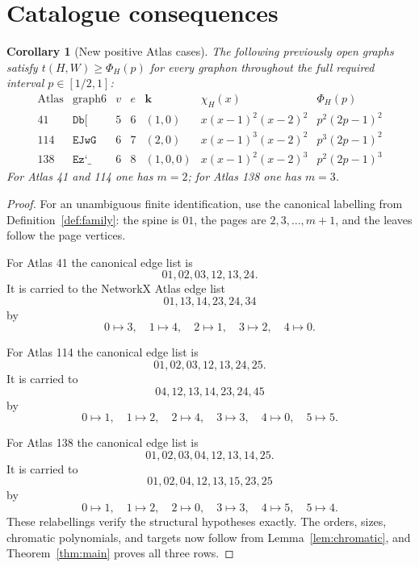 \documentclass[11pt]{article}
\newtheorem{corollary}[theorem]{Corollary}
\begin{document}
\section{Catalogue consequences}

\begin{corollary}[New positive Atlas cases]\label{cor:atlas}
The following previously open graphs satisfy
$t(H,W)\geq\Phi_H(p)$ for every graphon throughout the full required
interval $p\in[1/2,1]$:
\[
\begin{array}{c|c|c|c|c|c|c}
\text{Atlas}&\text{graph6}&v&e&\mathbf{k}&\chi_H(x)&\Phi_H(p)\\ \hline
41&\texttt{Db[}&5&6&(1,0)&x(x-1)^2(x-2)^2&p^2(2p-1)^2\\
114&\texttt{EJwG}&6&7&(2,0)&x(x-1)^3(x-2)^2&p^3(2p-1)^2\\
138&\texttt{Ez`\_}&6&8&(1,0,0)&x(x-1)^2(x-2)^3&p^2(2p-1)^3
\end{array}
\]
For Atlas 41 and 114 one has $m=2$; for Atlas 138 one has $m=3$.
\end{corollary}

\begin{proof}
For an unambiguous finite identification, use the canonical labelling
from Definition~\ref{def:family}: the spine is $01$, the pages are
$2,3,\ldots,m+1$, and the leaves follow the page vertices.

For Atlas 41 the canonical edge list is
\[
 01,02,03,12,13,24.
\]
It is carried to the NetworkX Atlas edge list
\[
 01,13,14,23,24,34
\]
by
\[
 0\mapsto3,\quad1\mapsto4,\quad2\mapsto1,\quad
 3\mapsto2,\quad4\mapsto0.
\]

For Atlas 114 the canonical edge list is
\[
 01,02,03,12,13,24,25.
\]
It is carried to
\[
 04,12,13,14,23,24,45
\]
by
\[
 0\mapsto1,\quad1\mapsto2,\quad2\mapsto4,\quad
 3\mapsto3,\quad4\mapsto0,\quad5\mapsto5.
\]

For Atlas 138 the canonical edge list is
\[
 01,02,03,04,12,13,14,25.
\]
It is carried to
\[
 01,02,04,12,13,15,23,25
\]
by
\[
 0\mapsto1,\quad1\mapsto2,\quad2\mapsto0,\quad
 3\mapsto3,\quad4\mapsto5,\quad5\mapsto4.
\]
These relabellings verify the structural hypotheses exactly.  The
orders, sizes, chromatic polynomials, and targets now follow from
Lemma~\ref{lem:chromatic}, and Theorem~\ref{thm:main} proves all three
rows.
\end{proof}
\end{document}
